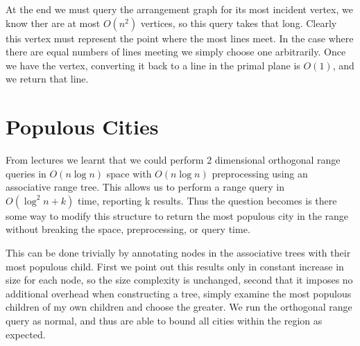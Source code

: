 \documentclass{article}
\begin{document}
At the end we must query the arrangement graph for its most incident vertex, we know ther are at most $O(n^2)$ vertices, so this query takes that long.
Clearly this vertex must represent the point where the most lines meet.
In the case where there are equal numbers of lines meeting we simply choose one arbitrarily.
Once we have the vertex, converting it back to a line in the primal plane is $O(1)$, and we return that line.

\section {Populous Cities}

From lectures we learnt that we could perform 2 dimensional orthogonal range queries in $O(n \log n)$ space with $O(n \log n)$ preprocessing using an associative range tree.
This allows us to perform a range query in $O(\log^2 n + k)$ time, reporting k results.
Thus the question becomes is there some way to modify this structure to return the most populous city in the range without breaking the space, preprocessing, or query time.

This can be done trivially by annotating nodes in the associative trees with their most populous child.
First we point out this results only in constant increase in size for each node, so the size complexity is unchanged, second that it imposes no additional overhead when constructing a tree, simply examine the most populous children of my own children and choose the greater.
We run the orthogonal range query as normal, and thus are able to bound all cities within the region as expected.
\end{document}
